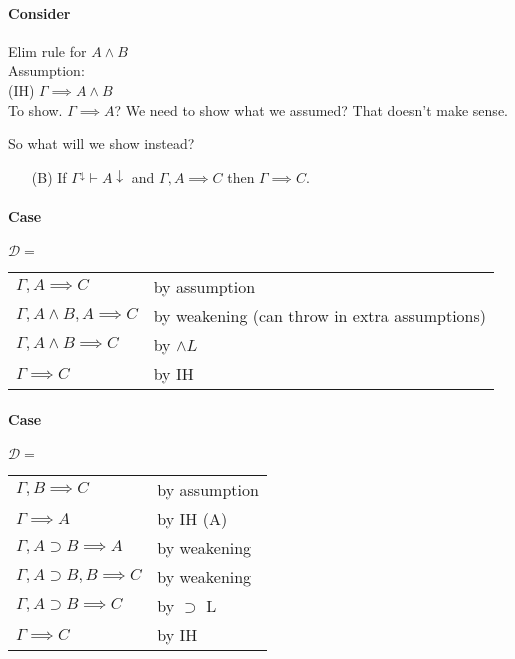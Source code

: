 \documentclass[12 pt]{article}
\begin{document}
       \paragraph{Consider} Elim rule for $A \land B$
       \\ Assumption: \DP
       \\ (IH) $\Gamma \implies A \land B$
       \\ To show. $\Gamma \implies A$? We need to show what we
       assumed? That doesn't make sense.

       So what will we show instead?
       \begin{enumerate}[(A)]
       \item[(B)] If $\Gamma^{\downarrow} \vdash A \downarrow$ and
         $\Gamma, A \implies C$ then $\Gamma \implies C$. 
       \end{enumerate}
       \paragraph{Case} $\mathcal{D}=$ \DP
       \\
       \begin{tabular}{l l}
         $\Gamma, A \implies C$& by assumption
         \\ $\Gamma, A \land B, A \implies C$& by weakening (can throw in extra assumptions)
         \\ $\Gamma, A \land B \implies C$ & by $\land L$
         \\ $\Gamma \implies C$ & by IH
       \end{tabular}
       \paragraph{Case} $\mathcal{D} =$ \DP
       \\
       \begin{tabular}{l l}
         $\Gamma, B \implies C$& by assumption
         \\ $\Gamma \implies A$ & by IH (A)
         \\ $\Gamma, A \supset B \implies A$ & by weakening
         \\ $\Gamma, A \supset B, B \implies C$& by weakening
         \\ $\Gamma, A \supset B \implies C$ & by $\supset$ L
         \\ $\Gamma \implies C$ & by IH
       \end{tabular}
\end{document}
